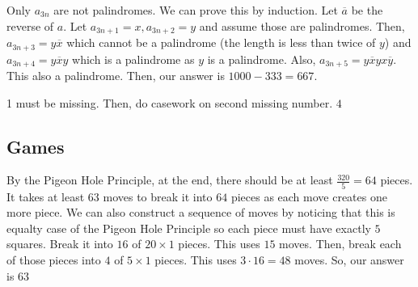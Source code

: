 \documentclass[11pt]{article}
\begin{document}
\begin{sol}
Only $a_{3n}$ are not palindromes. We can prove this by induction. Let $\overline{a}$ be the reverse of $a$. Let $a_{3n+1}=x,a_{3n+2}=y$ and assume those are palindromes. Then, $a_{3n+3}=y\overline{x}$ which cannot be a palindrome (the length is less than twice of $y$) and $a_{3n+4}=y\overline{x}y$ which is a palindrome as $y$ is a palindrome. Also, $a_{3n+5}=y\overline{x}yx\overline{y}$. This also a palindrome.
Then, our answer is $1000-333=\boxed{667}$.
\end{sol}


\begin{sol}
1 must be missing. Then, do casework on second missing number.
$\boxed{4}$
\end{sol}
\subsection{Games}


\begin{sol} 
By the Pigeon Hole Principle, at the end, there should be at least $\frac{320}{5}=64$ pieces. It takes at least $63$ moves to break it into $64$ pieces as each move creates one more piece. We can also construct a sequence of moves by noticing that this is equalty case of the Pigeon Hole Principle so each piece must have exactly $5$ squares. Break it into $16$ of $20\times 1$ pieces. This uses $15$ moves. Then, break each of those pieces into $4$ of $5\times 1$ pieces. This uses $3\cdot 16=48$ moves. So, our answer is $\boxed{63}$
\end{sol}

\end{document}
